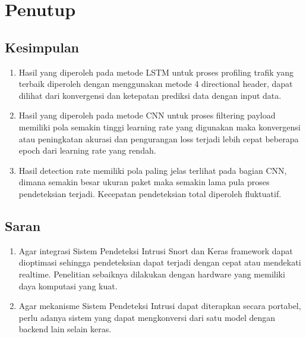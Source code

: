 \documentclass[./skripsi.tex]{subfiles}
\begin{document}
\chapter{Penutup}
\section{Kesimpulan}
\begin{enumerate}
    \item Hasil yang diperoleh pada metode LSTM untuk proses profiling trafik yang terbaik diperoleh dengan menggunakan metode 4 directional header, dapat dilihat dari konvergensi dan ketepatan prediksi data dengan input data.
    \item Hasil yang diperoleh pada metode CNN untuk proses filtering payload memiliki pola semakin tinggi learning rate yang digunakan maka konvergensi atau peningkatan akurasi dan pengurangan loss terjadi lebih cepat beberapa epoch dari learning rate yang rendah.
    \item Hasil detection rate memiliki pola paling jelas terlihat pada bagian CNN, dimana semakin besar ukuran paket maka semakin lama pula proses pendeteksian terjadi. Kecepatan pendeteksian total diperoleh fluktuatif.
\end{enumerate}
\section{Saran}
\begin{enumerate}
    \item Agar integrasi Sistem Pendeteksi Intrusi Snort dan Keras framework dapat dioptimasi sehingga pendeteksian dapat terjadi dengan cepat atau mendekati realtime. Penelitian sebaiknya dilakukan dengan hardware yang memiliki daya komputasi yang kuat.
    \item Agar mekanisme Sistem Pendeteksi Intrusi dapat diterapkan secara portabel, perlu adanya sistem yang dapat mengkonversi dari satu model dengan backend lain selain keras.
\end{enumerate}
\end{document}

